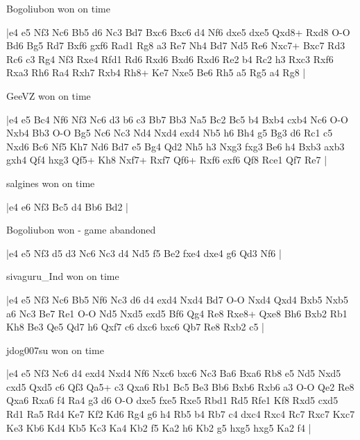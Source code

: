 \showboard

Bogoliubon won on time

\makegametitle
|e4 e5 Nf3 Nc6 Bb5 d6 Nc3 Bd7 Bxc6 Bxc6 d4 Nf6 dxe5 dxe5 Qxd8+ Rxd8 O-O Bd6 Bg5 Rd7 Bxf6 gxf6 Rad1 Rg8 a3 Re7 Nh4 Bd7 Nd5 Re6 Nxc7+ Bxc7 Rd3 Rc6 c3 Rg4 Nf3 Rxe4 Rfd1 Rd6 Rxd6 Bxd6 Rxd6 Re2 b4 Rc2 h3 Rxc3 Rxf6 Rxa3 Rh6 Ra4 Rxh7 Rxb4 Rh8+ Ke7 Nxe5 Be6 Rh5 a5 Rg5 a4 Rg8  |

\showboard

GeeVZ won on time

\makegametitle
|e4 e5 Bc4 Nf6 Nf3 Nc6 d3 b6 c3 Bb7 Bb3 Na5 Bc2 Bc5 b4 Bxb4 cxb4 Nc6 O-O Nxb4 Bb3 O-O Bg5 Nc6 Nc3 Nd4 Nxd4 exd4 Nb5 h6 Bh4 g5 Bg3 d6 Rc1 c5 Nxd6 Bc6 Nf5 Kh7 Nd6 Bd7 e5 Bg4 Qd2 Nh5 h3 Nxg3 fxg3 Be6 h4 Bxb3 axb3 gxh4 Qf4 hxg3 Qf5+ Kh8 Nxf7+ Rxf7 Qf6+ Rxf6 exf6 Qf8 Rce1 Qf7 Re7  |

\showboard

salgines won on time

\makegametitle
|e4 e6 Nf3 Bc5 d4 Bb6 Bd2  |

\showboard

Bogoliubon won - game abandoned

\makegametitle
|e4 e5 Nf3 d5 d3 Nc6 Nc3 d4 Nd5 f5 Be2 fxe4 dxe4 g6 Qd3 Nf6  |

\showboard

sivaguru\_Ind won on time

\makegametitle
|e4 e5 Nf3 Nc6 Bb5 Nf6 Nc3 d6 d4 exd4 Nxd4 Bd7 O-O Nxd4 Qxd4 Bxb5 Nxb5 a6 Nc3 Be7 Re1 O-O Nd5 Nxd5 exd5 Bf6 Qg4 Re8 Rxe8+ Qxe8 Bh6 Bxb2 Rb1 Kh8 Be3 Qe5 Qd7 h6 Qxf7 c6 dxc6 bxc6 Qb7 Re8 Rxb2 c5  |

\showboard

jdog007su won on time

\makegametitle
|e4 e5 Nf3 Nc6 d4 exd4 Nxd4 Nf6 Nxc6 bxc6 Nc3 Ba6 Bxa6 Rb8 e5 Nd5 Nxd5 cxd5 Qxd5 c6 Qf3 Qa5+ c3 Qxa6 Rb1 Bc5 Be3 Bb6 Bxb6 Rxb6 a3 O-O Qe2 Re8 Qxa6 Rxa6 f4 Ra4 g3 d6 O-O dxe5 fxe5 Rxe5 Rbd1 Rd5 Rfe1 Kf8 Rxd5 cxd5 Rd1 Ra5 Rd4 Ke7 Kf2 Kd6 Rg4 g6 h4 Rb5 b4 Rb7 c4 dxc4 Rxc4 Rc7 Rxc7 Kxc7 Ke3 Kb6 Kd4 Kb5 Kc3 Ka4 Kb2 f5 Ka2 h6 Kb2 g5 hxg5 hxg5 Ka2 f4  |

